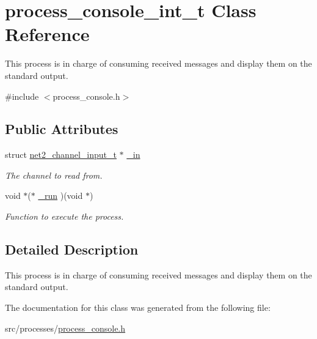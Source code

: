 \hypertarget{structprocess__console__int__t}{}\section{process\+\_\+console\+\_\+int\+\_\+t Class Reference}
\label{structprocess__console__int__t}


This process is in charge of consuming received messages and display them on the standard output.  




{\ttfamily \#include $<$process\+\_\+console.\+h$>$}

\subsection*{Public Attributes}
\begin{DoxyCompactItemize}
\item 
\hypertarget{structprocess__console__int__t_a2b11271b3a29fed457b30fd477873daf}{}struct \hyperlink{structnet2__channel__input__t}{net2\+\_\+channel\+\_\+input\+\_\+t} $\ast$ \hyperlink{structprocess__console__int__t_a2b11271b3a29fed457b30fd477873daf}{\+\_\+in}\label{structprocess__console__int__t_a2b11271b3a29fed457b30fd477873daf}

\begin{DoxyCompactList}\small\item\em The channel to read from. \end{DoxyCompactList}\item 
\hypertarget{structprocess__console__int__t_a69ca5fefb313c7ae4471fa3ba959e2a3}{}void $\ast$($\ast$ \hyperlink{structprocess__console__int__t_a69ca5fefb313c7ae4471fa3ba959e2a3}{\+\_\+run} )(void $\ast$)\label{structprocess__console__int__t_a69ca5fefb313c7ae4471fa3ba959e2a3}

\begin{DoxyCompactList}\small\item\em Function to execute the process. \end{DoxyCompactList}\end{DoxyCompactItemize}


\subsection{Detailed Description}
This process is in charge of consuming received messages and display them on the standard output. 

The documentation for this class was generated from the following file\+:\begin{DoxyCompactItemize}
\item 
src/processes/\hyperlink{process__console_8h}{process\+\_\+console.\+h}\end{DoxyCompactItemize}
